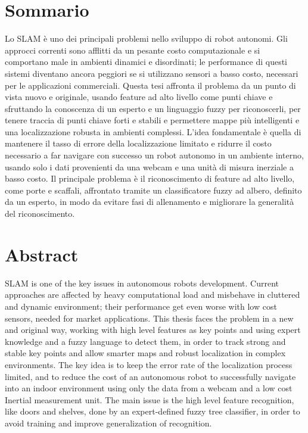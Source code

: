 \newpage
\chapter*{Sommario}


Lo SLAM è uno dei principali problemi nello sviluppo di robot autonomi. Gli approcci correnti sono afflitti da un pesante costo computazionale e si comportano male in ambienti dinamici e disordinati; le performance di questi sistemi diventano ancora peggiori se si utilizzano sensori a basso costo, necessari per le applicazioni commerciali.
Questa tesi affronta il problema da un punto di vista nuovo e originale, usando feature ad alto livello come punti chiave e sfruttando la conoscenza di un esperto e un linguaggio fuzzy per riconoscerli, per tenere traccia di punti chiave forti e stabili e permettere mappe più intelligenti e una localizzazione robusta in ambienti complessi. L'idea fondamentale è quella di mantenere il tasso di errore della localizzazione limitato e ridurre il costo necessario a far navigare con successo un robot autonomo in un ambiente interno, usando solo i dati provenienti da una webcam e una unità di misura inerziale a basso costo.
Il principale problema è il riconoscimento di feature ad alto livello, come porte e scaffali, affrontato tramite un classificatore fuzzy ad albero, definito da un esperto, in modo da evitare fasi di allenamento e migliorare la generalità del riconoscimento.

\chapter*{Abstract}


SLAM is one of the key issues in autonomous robots development. Current approaches are affected by heavy computational load and misbehave in cluttered and dynamic environment; their performance get even worse with low cost sensors, needed for market applications.
This thesis faces the problem in a new and original way, working with high level features as key points and using expert knowledge and a fuzzy language to detect them, in order to track strong and stable key points and allow smarter maps and robust localization in complex environments. The key idea is to keep the error rate of the localization process limited, and to reduce the cost of an autonomous robot to successfully navigate into an indoor environment using only the data from a webcam and a low cost Inertial measurement unit.
The main issue is the high level feature recognition, like doors and shelves, done by an expert-defined fuzzy tree classifier, in order to avoid training and improve generalization of recognition.
